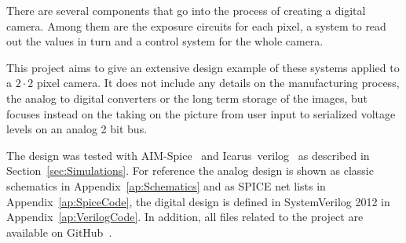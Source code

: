 
There are several components that go into the process of creating a digital camera.
Among them are the exposure circuits for each pixel, a system to read out the values in turn
and a control system for the whole camera.

This project aims to give an extensive design example of these systems applied to a $2 \cdot 2$ pixel camera.
It does not include any details on the manufacturing process, the analog to digital converters or the long term storage of the images, but focuses instead
on the taking on the picture from user input to serialized voltage levels on an analog 2 bit bus.

The design was tested with AIM-Spice~\cite{AIMSpice} and Icarus~verilog~\cite{icarusVL} as described in Section~\ref{sec:Simulations}.
For reference the analog design is shown as classic schematics in Appendix~\ref{ap:Schematics} and as SPICE net lists in Appendix~\ref{ap:SpiceCode}, the digital design is defined in SystemVerilog 2012 in Appendix~\ref{ap:VerilogCode}.
In addition, all files related to the project are available on GitHub~\cite{githubProject}.